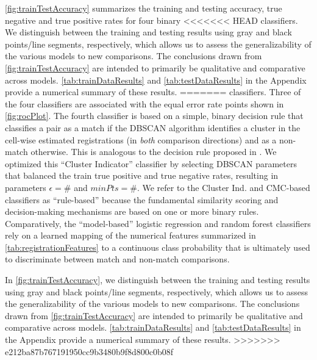 \documentclass[reprint]{JASA}
\begin{document}
\autoref{fig:trainTestAccuracy} summarizes the training and testing
accuracy, true negative and true positive rates for four binary
<<<<<<< HEAD
classifiers. We distinguish between the training and testing results
using gray and black points/line segments, respectively, which allows us
to assess the generalizability of the various models to new comparisons.
The conclusions drawn from \autoref{fig:trainTestAccuracy} are intended
to primarily be qualitative and comparative across models.
\autoref{tab:trainDataResults} and \autoref{tab:testDataResults} in the
Appendix provide a numerical summary of these results.
=======
classifiers. Three of the four classifiers are associated with the equal
error rate points shown in \autoref{fig:rocPlot}. The fourth classifier
is based on a simple, binary decision rule that classifies a pair as a
match if the DBSCAN algorithm identifies a cluster in the cell-wise
estimated registrations (in \emph{both} comparison directions) and as a
non-match otherwise. This is analogous to the decision rule proposed in
\citet{zhang_convergence_2021}. We optimized this ``Cluster Indicator''
classifier by selecting DBSCAN parameters that balanced the train true
positive and true negative rates, resulting in parameters
\(\epsilon = \#\) and \(minPts = \#\). We refer to the Cluster Ind. and
CMC-based classifiers as ``rule-based'' because the fundamental
similarity scoring and decision-making mechanisms are based on one or
more binary rules. Comparatively, the ``model-based'' logistic
regression and random forest classifiers rely on a learned mapping of
the numerical features summarized in \autoref{tab:registrationFeatures}
to a continuous class probability that is ultimately used to
discriminate between match and non-match comparisons.

In \autoref{fig:trainTestAccuracy}, we distinguish between the training
and testing results using gray and black points/line segments,
respectively, which allows us to assess the generalizability of the
various models to new comparisons. The conclusions drawn from
\autoref{fig:trainTestAccuracy} are intended to primarily be qualitative
and comparative across models. \autoref{tab:trainDataResults} and
\autoref{tab:testDataResults} in the Appendix provide a numerical
summary of these results.
>>>>>>> e212ba87b767191950cc9b3480b9f8d800c0b08f
\end{document}
